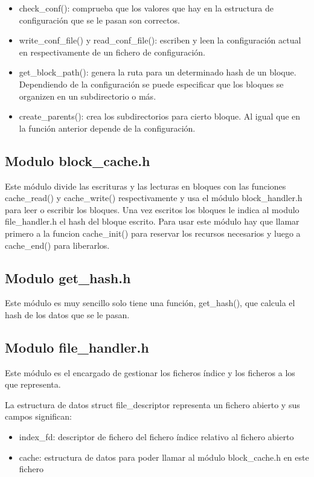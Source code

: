 \documentclass[a4paper,12pt]{article}
\begin{document}
\begin{itemize}
\item check\_conf(): comprueba que los valores que hay en la estructura de configuración que se le pasan son correctos.

\item write\_conf\_file() y read\_conf\_file(): escriben y leen la configuración actual en respectivamente de un fichero de configuración.

\item get\_block\_path(): genera la ruta para un determinado hash de un bloque. Dependiendo de la configuración se puede especificar que los bloques se organizen en un subdirectorio o más.

\item create\_parents(): crea los subdirectorios para cierto bloque. Al igual que en la función anterior depende de la configuración.
\end{itemize}

\subsection{Modulo block\_cache.h}

Este módulo divide las escrituras y las lecturas en bloques con las funciones cache\_read() y cache\_write() respectivamente y usa el módulo block\_handler.h para leer o escribir los bloques. Una vez escritos los bloques le indica al modulo file\_handler.h el hash del bloque escrito. Para usar este módulo hay que llamar primero a la funcion cache\_init() para reservar los recursos necesarios y luego a cache\_end() para liberarlos.

\subsection{Modulo get\_hash.h}

Este módulo es muy sencillo solo tiene una función, get\_hash(), que calcula el hash de los datos que se le pasan.

\subsection{Modulo file\_handler.h}

Este módulo es el encargado de gestionar los ficheros índice y los ficheros a los que representa.
\bigskip

La estructura de datos struct file\_descriptor representa un fichero abierto y sus campos significan:
\begin{itemize}
\item index\_fd: descriptor de fichero del fichero índice relativo al fichero abierto
\item cache: estructura de datos para poder llamar al módulo block\_cache.h en este fichero
\end{itemize}
\end{document}
